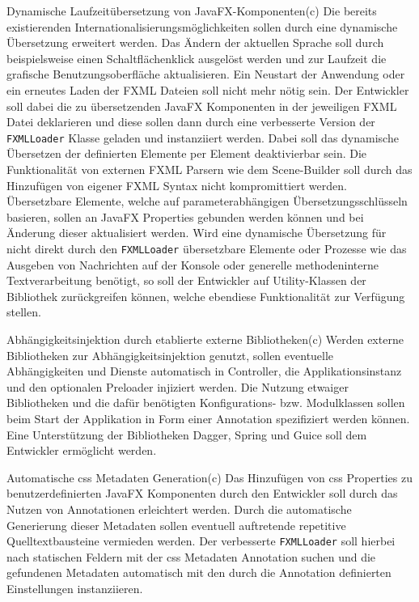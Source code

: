 \begin{freq}{Dynamische Laufzeitübersetzung von JavaFX-Komponenten}(c)
	Die bereits existierenden Internationalisierungsmöglichkeiten sollen durch eine dynamische Übersetzung erweitert werden. Das Ändern der aktuellen Sprache soll durch beispielsweise einen Schaltflächenklick ausgelöst werden und zur Laufzeit die grafische Benutzungsoberfläche aktualisieren. Ein Neustart der Anwendung oder ein erneutes Laden der FXML Dateien soll nicht mehr nötig sein. Der Entwickler soll dabei die zu übersetzenden JavaFX Komponenten in der jeweiligen FXML Datei deklarieren und diese sollen dann durch eine verbesserte Version der \texttt{FXMLLoader} Klasse geladen und instanziiert werden. Dabei soll das dynamische Übersetzen der definierten Elemente per Element deaktivierbar sein. Die Funktionalität von externen FXML Parsern wie dem Scene-Builder soll durch das Hinzufügen von eigener FXML Syntax nicht kompromittiert werden. Übersetzbare Elemente, welche auf parameterabhängigen Übersetzungsschlüsseln basieren, sollen an JavaFX Properties gebunden werden können und bei Änderung dieser aktualisiert werden. Wird eine dynamische Übersetzung für nicht direkt durch den \texttt{FXMLLoader} übersetzbare Elemente oder Prozesse wie das Ausgeben von Nachrichten auf der Konsole oder generelle methodeninterne Textverarbeitung benötigt, so soll der Entwickler auf Utility-Klassen der Bibliothek zurückgreifen können, welche ebendiese Funktionalität zur Verfügung stellen.
\end{freq}
\begin{freq}{Abhängigkeitsinjektion durch etablierte externe Bibliotheken}(c)
	Werden externe Bibliotheken zur Abhängigkeitsinjektion genutzt, sollen eventuelle Abhängigkeiten und Dienste automatisch in Controller, die Applikationsinstanz und den optionalen Preloader injiziert werden. Die Nutzung etwaiger Bibliotheken und die dafür benötigten Konfigurations- bzw. Modulklassen sollen beim Start der Applikation in Form einer Annotation spezifiziert werden können. Eine Unterstützung der Bibliotheken Dagger, Spring und Guice soll dem Entwickler ermöglicht werden.
\end{freq}
\begin{freq}{Automatische \ac{css} Metadaten Generation}(c)
	Das Hinzufügen von \ac{css} Properties zu benutzerdefinierten JavaFX Komponenten durch den Entwickler soll durch das Nutzen von Annotationen erleichtert werden. Durch die automatische Generierung dieser Metadaten sollen eventuell auftretende repetitive Quelltextbausteine vermieden werden. Der verbesserte \texttt{FXMLLoader} soll hierbei nach statischen Feldern mit der \ac{css} Metadaten Annotation suchen und die gefundenen Metadaten automatisch mit den durch die Annotation definierten Einstellungen instanziieren.
\end{freq}
